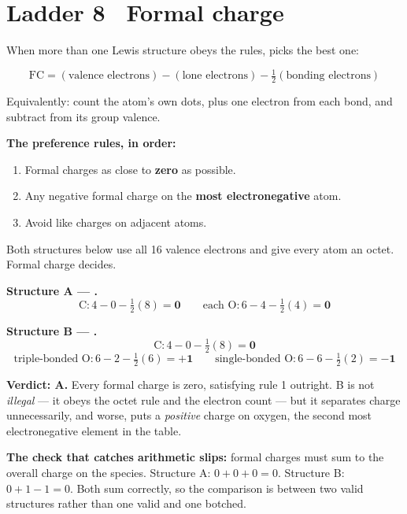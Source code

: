 \documentclass{apchem-worksheet}
\begin{document}
\section*{\sffamily Ladder 8 \textbullet\ Formal charge}

When more than one Lewis structure obeys the rules, 
picks the best one:

\[ \text{FC} = (\text{valence electrons})
   - (\text{lone electrons}) - \tfrac{1}{2}(\text{bonding electrons}) \]

Equivalently: count the atom's own dots, plus one electron from each
bond, and subtract from its group valence.

\textbf{The preference rules, in order:}
\begin{enumerate}[leftmargin=*,itemsep=0.1em]
  \item Formal charges as close to \textbf{zero} as possible.
  \item Any negative formal charge on the \textbf{most electronegative}
        atom.
  \item Avoid like charges on adjacent atoms.
\end{enumerate}

\begin{workedexample}
Both structures below use all 16 valence electrons and give every atom
an octet. Formal charge decides.

\textbf{Structure A --- .}
\[ \text{C}: 4 - 0 - \tfrac{1}{2}(8) = \mathbf{0} \qquad
   \text{each O}: 6 - 4 - \tfrac{1}{2}(4) = \mathbf{0} \]

\textbf{Structure B --- .}
\[ \text{C}: 4 - 0 - \tfrac{1}{2}(8) = \mathbf{0} \]
\[ \text{triple-bonded O}: 6 - 2 - \tfrac{1}{2}(6) = \mathbf{+1} \qquad
   \text{single-bonded O}: 6 - 6 - \tfrac{1}{2}(2) = \mathbf{-1} \]

\textbf{Verdict: A.} Every formal charge is zero, satisfying rule 1
outright. B is not \emph{illegal} --- it obeys the octet rule and the
electron count --- but it separates charge unnecessarily, and worse,
puts a \emph{positive} charge on oxygen, the second most electronegative
element in the table.

\textbf{The check that catches arithmetic slips:} formal charges must
sum to the overall charge on the species. Structure A: $0+0+0 = 0$.
Structure B: $0 + 1 - 1 = 0$. Both sum correctly, so the comparison is
between two valid structures rather than one valid and one botched.
\end{workedexample}
\end{document}
